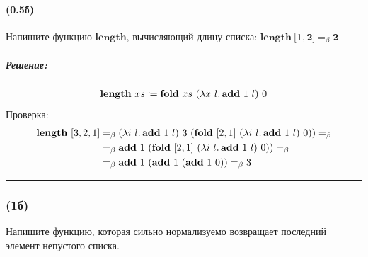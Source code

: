 \documentclass{article}
\newenvironment{proof}{\subparagraph{\hspace{-1em}Решение:\newline}\-}{\par\noindent\rule{\textwidth}{0.4pt}}
\newcommand{\term}[1]{\mathbf{#1}}
\newcommand{\ap}{~}
\newcommand{\eqbeta}{=_\beta}
\newcommand{\tlist}[1]{\term{[}#1\term{]}} %
\begin{document}
    \paragraph{(0.5б)}

    Напишите функцию $\term{length}$, вычисляющий длину списка: $\term{length} \ap \tlist{\term{1}, \term{2}} \eqbeta \term{2}$

    \begin{proof}
        \begin{gather}
            \term{length}~xs \coloneqq \term{fold}~xs~(\lambda x~l\ldotp \term{add}~1~l)~0
        \end{gather}
        Проверка:
        \begin{align}
            \term{length}~[3, 2, 1] & \eqbeta (\lambda i~l\ldotp \term{add}~1~l)~3~(\term{fold}~[2, 1]~(\lambda i~l\ldotp \term{add}~1~l)~0)) \eqbeta \\
                                    & \eqbeta \term{add}~1~(\term{fold}~[2, 1]~(\lambda i~l\ldotp \term{add}~1~l)~0)) \eqbeta \\
                                    & \eqbeta \term{add}~1~(\term{add}~1~(\term{add}~1~0)) \eqbeta 3
        \end{align}
    \end{proof}

    \subsubsection{(1б)}

    Напишите функцию, которая сильно нормализуемо возвращает последний элемент непустого списка.
\end{document}
